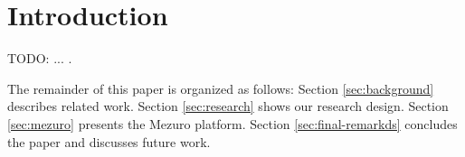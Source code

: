\section{Introduction}
\label{introduction}

TODO: ... \cite{meirelles2013monitoramento}.

The remainder of this paper is organized as follows:
%
Section \ref{sec:background} describes related work.
%
Section \ref{sec:research} shows our research design.
%
Section \ref{sec:mezuro} presents the Mezuro platform.
%
Section \ref{sec:final-remarkds} concludes the paper and discusses
future work.


